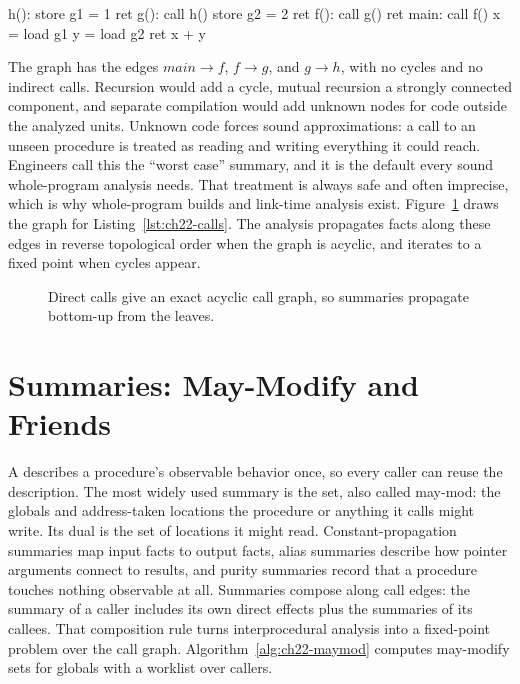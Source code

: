 \begin{irlisting}[caption={Three procedures and a main program with direct calls and one global store each.},label={lst:ch22-calls}]
h(): store g1 = 1
     ret
g(): call h()
     store g2 = 2
     ret
f(): call g()
     ret
main: call f()
      x = load g1
      y = load g2
      ret x + y
\end{irlisting}

The graph has the edges $main \to f$, $f \to g$, and $g \to h$, with no cycles and no indirect calls.
Recursion would add a cycle, mutual recursion a strongly connected component, and separate compilation would add unknown nodes for code outside the analyzed units.
Unknown code forces sound approximations: a call to an unseen procedure is treated as reading and writing everything it could reach.
Engineers call this the \enquote{worst case} summary, and it is the default every sound whole-program analysis needs.
That treatment is always safe and often imprecise, which is why whole-program builds and link-time analysis exist.
Figure~\ref{fig:ch22-call-graph} draws the graph for Listing~\ref{lst:ch22-calls}.
The analysis propagates facts along these edges in reverse topological order when the graph is acyclic, and iterates to a fixed point when cycles appear.

\begin{figure}
  \centering
  \caption{Direct calls give an exact acyclic call graph, so summaries propagate bottom-up from the leaves.}
  \label{fig:ch22-call-graph}
\end{figure}

\section{Summaries: May-Modify and Friends}
\label{sec:ch22-summaries}

A  describes a procedure's observable behavior once, so every caller can reuse the description.
The most widely used summary is the  set, also called may-mod: the globals and address-taken locations the procedure or anything it calls might write.
Its dual is the  set of locations it might read.
Constant-propagation summaries map input facts to output facts, alias summaries describe how pointer arguments connect to results, and purity summaries record that a procedure touches nothing observable at all.
Summaries compose along call edges: the summary of a caller includes its own direct effects plus the summaries of its callees.
That composition rule turns interprocedural analysis into a fixed-point problem over the call graph.
Algorithm~\ref{alg:ch22-maymod} computes may-modify sets for globals with a worklist over callers.

